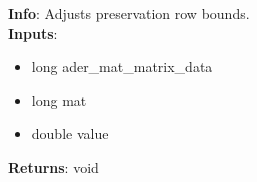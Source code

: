 \textbf{Info}: Adjusts preservation row bounds.\\

\noindent \textbf{Inputs}:
\begin{itemize}
\item{long ader\_mat\_matrix\_data}
\item{long mat}
\item{double value}
\end{itemize}

\noindent \textbf{Returns}: void
